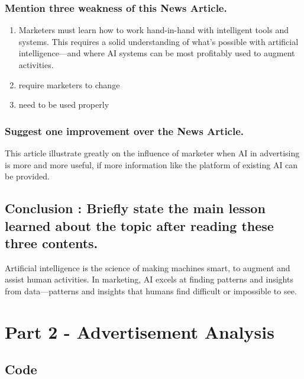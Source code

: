 \documentclass[12pt]{article}%
\begin{document}
\subsubsection{Mention three weakness of this News Article.}

\begin{enumerate}
\item Marketers must learn how to work hand-in-hand with intelligent tools and systems. This requires a solid understanding of what’s possible with artificial intelligence—and where AI systems can be most profitably used to augment activities.
\item require marketers to change
\item need to be used properly
\end{enumerate}


\subsubsection{Suggest one improvement over the News Article.}

This article illustrate greatly on the influence of marketer when AI in advertising is more and more useful, if more information like the platform of existing AI can be provided.


\subsection{Conclusion : Briefly state the main lesson learned about the topic after reading these three contents.}

Artificial intelligence is the science of making machines smart, to augment and assist human activities. In marketing, AI excels at finding patterns and insights from data—patterns and insights that humans find difficult or impossible to see. 


\section{Part 2 - Advertisement Analysis}

\subsection{Code}
\end{document}
